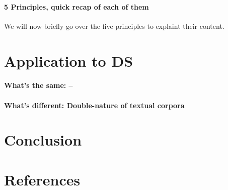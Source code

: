 \documentclass{article}
\begin{document}
\paragraph{5 Principles, quick recap of each of them}

We will now briefly go over the five principles to explaint their content.



\section{Application to DS}\hypertarget{sec4}{ }
\paragraph{What's the same: --}
\paragraph{What's different: Double-nature of textual corpora}
\section{Conclusion}

\section{References}\hypertarget{sec5}{ }
\end{document}
